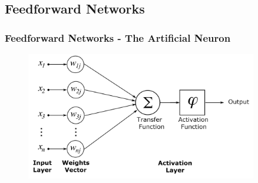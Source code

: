 \documentclass{beamer}
\begin{document}
\subsection{Feedforward Networks}
\begin{frame}
\frametitle{Feedforward Networks - The Artificial Neuron}

\begin{figure}[!htbp]
\centering
\includegraphics[width=0.9\textwidth]{pictures/ArtificialNeuronModel.png}
\label{fig:neuron}
\end{figure}


\end{frame}

\end{document}
